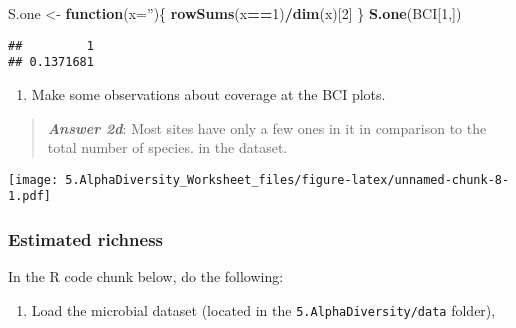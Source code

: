 \documentclass[
]{article}
\newenvironment{Shaded}{\begin{snugshade}}{\end{snugshade}}
\newcommand{\ControlFlowTok}[1]{\textcolor[rgb]{0.13,0.29,0.53}{\textbf{#1}}}
\newcommand{\DataTypeTok}[1]{\textcolor[rgb]{0.13,0.29,0.53}{#1}}
\newcommand{\DecValTok}[1]{\textcolor[rgb]{0.00,0.00,0.81}{#1}}
\newcommand{\KeywordTok}[1]{\textcolor[rgb]{0.13,0.29,0.53}{\textbf{#1}}}
\newcommand{\NormalTok}[1]{#1}
\newcommand{\OperatorTok}[1]{\textcolor[rgb]{0.81,0.36,0.00}{\textbf{#1}}}
\newcommand{\StringTok}[1]{\textcolor[rgb]{0.31,0.60,0.02}{#1}}
\providecommand{\tightlist}{%
  \setlength{\itemsep}{0pt}\setlength{\parskip}{0pt}}
\begin{document}
\begin{Shaded}
\begin{Highlighting}[]
\NormalTok{S.one <-}\StringTok{ }\ControlFlowTok{function}\NormalTok{(}\DataTypeTok{x=}\StringTok{''}\NormalTok{)\{}
  \KeywordTok{rowSums}\NormalTok{(x}\OperatorTok{==}\DecValTok{1}\NormalTok{)}\OperatorTok{/}\KeywordTok{dim}\NormalTok{(x)[}\DecValTok{2}\NormalTok{]}
\NormalTok{\}}
\KeywordTok{S.one}\NormalTok{(BCI[}\DecValTok{1}\NormalTok{,])}
\end{Highlighting}
\end{Shaded}

\begin{verbatim}
##         1 
## 0.1371681
\end{verbatim}

\begin{enumerate}
\def\labelenumi{\alph{enumi}.}
\setcounter{enumi}{3}
\tightlist
\item
  Make some observations about coverage at the BCI plots.
\end{enumerate}

\begin{quote}
\textbf{\emph{Answer 2d}}: Most sites have only a few ones in it in
comparison to the total number of species. in the dataset.
\end{quote}

\begin{Shaded}
\end{Shaded}

\texttt{[image: 5.AlphaDiversity\_Worksheet\_files/figure-latex/unnamed-chunk-8-1.pdf]}

\hypertarget{estimated-richness}{%
\subsubsection{Estimated richness}\label{estimated-richness}}

In the R code chunk below, do the following:

\begin{enumerate}
\def\labelenumi{\arabic{enumi}.}
\tightlist
\item
  Load the microbial dataset (located in the
  \texttt{5.AlphaDiversity/data} folder),
\end{enumerate}
\end{document}
